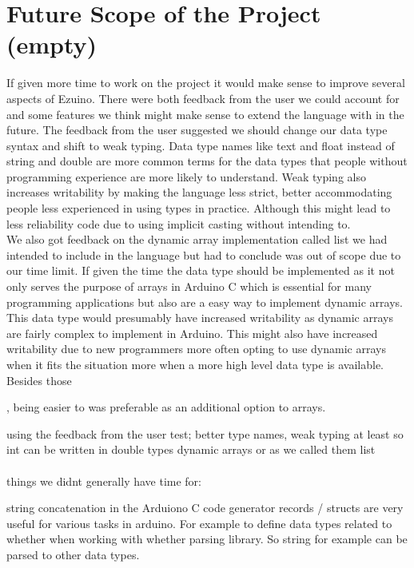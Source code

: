 \chapter{Future Scope of the Project (empty)}
If given more time to work on the project it would make sense to improve several aspects of Ezuino. There were both feedback from the user we could account for and some features we think might make sense to extend the language with in the future.
The feedback from the user suggested we should change our data type syntax and shift to weak typing. Data type names like text and float instead of string and double are more common terms for the data types that people without programming experience are more likely to understand. Weak typing also increases writability by making the language less strict, better accommodating people less experienced in using types in practice. Although this might lead to less reliability code due to using implicit casting without intending to. \\
We also got feedback on the dynamic array implementation called list we had intended to include in the language but had to conclude was out of scope due to our time limit. If given the time the data type should be implemented as it not only serves the purpose of arrays in Arduino C which is essential for many programming applications but also are a easy way to implement dynamic arrays. This data type would presumably have increased writability as dynamic arrays are fairly complex to implement in Arduino. This might also have increased writability due to new programmers more often opting to use dynamic arrays when it fits the situation more when a more high level data type is available. \\
Besides those 



, being easier to was preferable as an additional option to arrays.

using the feedback from the user test; better type names, weak typing at least so int can be written in double types
dynamic arrays or as we called them list
\\\\
things we didnt generally have time for:

string concatenation in the Arduiono C code generator
records / structs are very useful for various tasks in arduino. For example to define data types related to whether when working with whether
parsing library. So string for example can be parsed to other data types.
